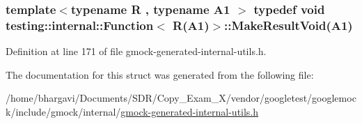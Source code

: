 \subsubsection[{\texorpdfstring{Make\+Result\+Void}{MakeResultVoid}}]{\setlength{\rightskip}{0pt plus 5cm}template$<$typename R , typename A1 $>$ typedef void {\bf testing\+::internal\+::\+Function}$<$ {\bf R}(A1)$>$\+::Make\+Result\+Void(A1)}\hypertarget{structtesting_1_1internal_1_1_function_3_01_r_07_a1_08_4_aab10495172953eb51fc3940c4c1e890a}{}\label{structtesting_1_1internal_1_1_function_3_01_r_07_a1_08_4_aab10495172953eb51fc3940c4c1e890a}


Definition at line 171 of file gmock-\/generated-\/internal-\/utils.\+h.



The documentation for this struct was generated from the following file\+:\begin{DoxyCompactItemize}
\item 
/home/bhargavi/\+Documents/\+S\+D\+R/\+Copy\+\_\+\+Exam\+\_\+X/vendor/googletest/googlemock/include/gmock/internal/\hyperlink{gmock-generated-internal-utils_8h}{gmock-\/generated-\/internal-\/utils.\+h}\end{DoxyCompactItemize}
